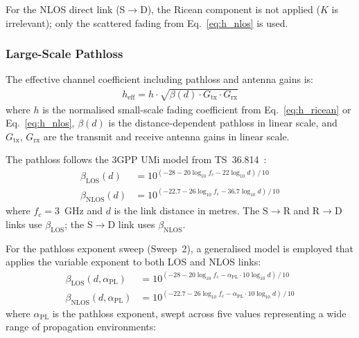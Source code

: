 \documentclass[journal]{IEEEtran} %
\begin{document}
For the NLOS direct link (S$\to$D), the Ricean component is not applied ($K$ is irrelevant); only the scattered fading from Eq.~\eqref{eq:h_nlos} is used.

\subsubsection{Large-Scale Pathloss}

The effective channel coefficient including pathloss and antenna gains is:
\begin{align}
    h_{\mathrm{eff}} = h \cdot \sqrt{\beta(d) \cdot G_{\mathrm{tx}} \cdot G_{\mathrm{rx}}}
    \label{eq:h_effective}
\end{align}
where $h$ is the normalised small-scale fading coefficient from Eq.~\eqref{eq:h_ricean} or Eq.~\eqref{eq:h_nlos}, $\beta(d)$ is the distance-dependent pathloss in linear scale, and $G_{\mathrm{tx}}$, $G_{\mathrm{rx}}$ are the transmit and receive antenna gains in linear scale.

The pathloss follows the 3GPP UMi model from TS~36.814~\cite{3gpp36814}:
\begin{align}
    \beta_{\mathrm{LOS}}(d) &= 10^{(-28 - 20\log_{10}f_c - 22\log_{10}d)\,/\,10} \label{eq:pl_los} \\
    \beta_{\mathrm{NLOS}}(d) &= 10^{(-22.7 - 26\log_{10}f_c - 36.7\log_{10}d)\,/\,10} \label{eq:pl_nlos}
\end{align}
where $f_c = 3$~GHz and $d$ is the link distance in metres. The S$\to$R and R$\to$D links use $\beta_{\mathrm{LOS}}$; the S$\to$D link uses $\beta_{\mathrm{NLOS}}$.

For the pathloss exponent sweep (Sweep~2), a generalised model is employed that applies the variable exponent to both LOS and NLOS links:
\begin{align}
    \beta_{\mathrm{LOS}}(d, \alpha_{\mathrm{PL}}) &= 10^{(-28 - 20\log_{10}f_c - \alpha_{\mathrm{PL}} \cdot 10\log_{10}d)\,/\,10} \label{eq:pl_los_var} \\
    \beta_{\mathrm{NLOS}}(d, \alpha_{\mathrm{PL}}) &= 10^{(-22.7 - 26\log_{10}f_c - \alpha_{\mathrm{PL}} \cdot 10\log_{10}d)\,/\,10} \label{eq:pl_nlos_var}
\end{align}
where $\alpha_{\mathrm{PL}}$ is the pathloss exponent, swept across five values representing a wide range of propagation environments:
\end{document}
